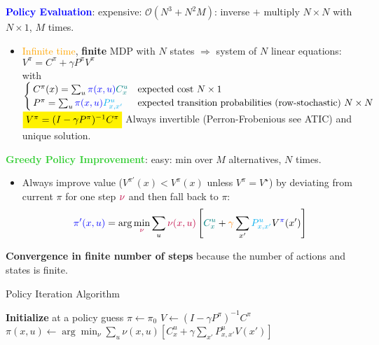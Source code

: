 \begin{tcolorbox}[colframe=cyan!50!black, colback=cyan!5!white, title=Policy Iteration]
\textbf{\textcolor{blue}{Policy Evaluation}}: expensive: $\mathcal{O}(N^3+N^2M)$: inverse $+$ multiply $N \times N$ with $N \times 1$, $M$ times.
\begin{itemize}
    \item \textcolor{orange}{Infinite time}, \textbf{finite} MDP with $N$ states $\Rightarrow$ system of $N$ linear equations: \quad $\boxed{V^{\pi} = C^{\pi} + \gamma P^{\pi} V^{\pi}}$ \\
    with
    $\begin{cases}
        C^{\pi}(x) = \sum_{u} \textcolor{blue}{\pi(x, u)} {\color{teal}C^u_x} & \text{expected cost } N \times 1\\
        P^{\pi} = \sum_{u} \textcolor{blue}{\pi(x, u)} {\color{cyan}P^u_{x,x'}} & \text{expected transition probabilities (row-stochastic) } N \times N
    \end{cases}$ \\
    $\stabilo{V^{\pi} = (I - \gamma P^{\pi})^{-1} C^{\pi}}$ \qquad Always invertible (Perron-Frobenious see ATIC) and unique solution.
\end{itemize}

\textbf{\textcolor{LimeGreen}{Greedy Policy Improvement}}: easy: min over $M$ alternatives, $N$ times.
\begin{itemize}
    \item Always improve value ($V^{\pi'}(x) < V^{\pi}(x)$ unless $V^{\pi} = V^\star$) by deviating from current $\pi$ for one step $\textcolor{purple}{\nu}$ and then fall back to $\pi$:
    \[
    {\color{blue}\pi'(x, u)} = \arg \min_{\textcolor{purple}{\nu}} \sum_{u} \textcolor{purple}{\nu(x, u)} \left[ {\color{teal}C^u_x} + {\color{orange}\gamma} \sum_{x'} {\color{cyan}P^u_{x,x'}} V^{\color{blue}\pi}(x') \right]
    \]
\end{itemize}
\textbf{Convergence in finite number of steps} because the number of actions and states is finite.
\end{tcolorbox}

\begin{algorithm}[H]
\caption{Policy Iteration Algorithm}
\begin{algorithmic}[1]
    \State \textbf{Initialize} at a policy guess $\pi \gets \pi_0$
    \State $V \gets (I - \gamma P^{\pi})^{-1} C^{\pi}$ 
    \State $\pi(x, u) \gets \arg \min_{\nu} \sum_{u} \nu(x, u) \left[ C^u_x + \gamma \sum_{x'} P^u_{x,x'} V(x') \right]$ 
    \EndFor
\end{algorithmic}
\end{algorithm}

